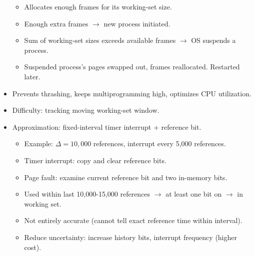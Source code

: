 \begin{itemize}
\begin{itemize}
        \item Allocates enough frames for its working-set size.
        \item Enough extra frames $\rightarrow$ new process initiated.
        \item Sum of working-set sizes exceeds available frames $\rightarrow$ OS suspends a process.
        \item Suspended process's pages swapped out, frames reallocated. Restarted later.
    \end{itemize}
    \item Prevents thrashing, keeps multiprogramming high, optimizes CPU utilization.
    \item Difficulty: tracking moving working-set window.
    \item Approximation: fixed-interval timer interrupt + reference bit.
    \begin{itemize}
        \item Example: $\Delta = 10,000$ references, interrupt every 5,000 references.
        \item Timer interrupt: copy and clear reference bits.
        \item Page fault: examine current reference bit and two in-memory bits.
        \item Used within last 10,000-15,000 references $\rightarrow$ at least one bit on $\rightarrow$ in working set.
        \item Not entirely accurate (cannot tell exact reference time within interval).
        \item Reduce uncertainty: increase history bits, interrupt frequency (higher cost).
    \end{itemize}
\end{itemize}

